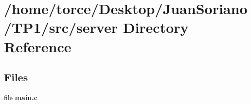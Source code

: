 \section{/home/torce/\+Desktop/\+Juan\+Soriano/\+T\+P1/src/server Directory Reference}
\label{dir_389a8de78ec0af90f2ea08e507753ab9}
\subsection*{Files}
\begin{DoxyCompactItemize}
\item 
file {\bf main.\+c}
\end{DoxyCompactItemize}
